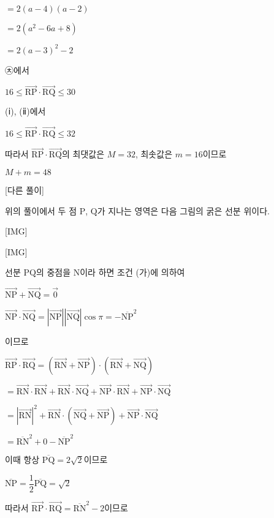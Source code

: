 \documentclass{oblivoir}
\begin{document}
$= 2(a-4)(a-2)$

$= 2\left(a^{2}- 6a + 8\right)$

$= 2(a-3)^{2}-2$

㉩에서 

$16\le\overrightarrow{\mathrm{RP}}\cdot\overrightarrow{\mathrm{RQ}}\le 30$

(ⅰ), (ⅱ)에서

$16\le\overrightarrow{\mathrm{RP}}\cdot\overrightarrow{\mathrm{RQ}}\le 32$

따라서 $\overrightarrow{\mathrm{RP}}\cdot\overrightarrow{\mathrm{RQ}}$의 최댓값은 $M = 32$, 최솟값은 $m = 16$이므로 

$M + m = 48$

[다른 풀이]

위의 풀이에서 두 점 $\mathrm{P}$, $\mathrm{Q}$가 지나는 영역은 다음 그림의 굵은 선분 위이다.

[IMG]

[IMG]

선분 $\mathrm{PQ}$의 중점을 $\mathrm{N}$이라 하면 조건 (가)에 의하여

$\overrightarrow{\mathrm{NP}} +\overrightarrow{\mathrm{NQ}} =\overrightarrow{0}$

$\overrightarrow{\mathrm{NP}}\cdot\overrightarrow{\mathrm{NQ}}= |\overrightarrow{\mathrm{NP}}| |\overrightarrow{\mathrm{NQ}}|\cos\pi = -\overline{\mathrm{NP}}^{2}$

이므로

$\overrightarrow{\mathrm{RP}}\cdot\overrightarrow{\mathrm{RQ}}$$=(\overrightarrow{\mathrm{RN}} +\overrightarrow{\mathrm{NP}})\cdot(\overrightarrow{\mathrm{RN}} +\overrightarrow{\mathrm{NQ}})$

$=\overrightarrow{\mathrm{RN}}\cdot\overrightarrow{\mathrm{RN}} +\overrightarrow{\mathrm{RN}}\cdot\overrightarrow{\mathrm{NQ}} +\overrightarrow{\mathrm{NP}}\cdot\overrightarrow{\mathrm{RN}} +\overrightarrow{\mathrm{NP}}\cdot\overrightarrow{\mathrm{NQ}}$

$= |\overrightarrow{\mathrm{RN}} |^{2}+\overrightarrow{\mathrm{RN}}\cdot(\overrightarrow{\mathrm{NQ}} +\overrightarrow{\mathrm{NP}})+\overrightarrow{\mathrm{NP}}\cdot\overrightarrow{\mathrm{NQ}}$

$=\overline{\mathrm{RN}}^{2}+0 -\overline{\mathrm{NP}}^{2}$

이때 항상 $\overline{\mathrm{PQ}} = 2\sqrt{2}$이므로

$\overline{\mathrm{NP}} =\dfrac{1}{2}\overline{\mathrm{PQ}} =\sqrt{2}$

따라서 $\overrightarrow{\mathrm{RP}}\cdot\overrightarrow{\mathrm{RQ}}$$=\overline{\mathrm{RN}}^{2}-2$이므로 
\end{document}
